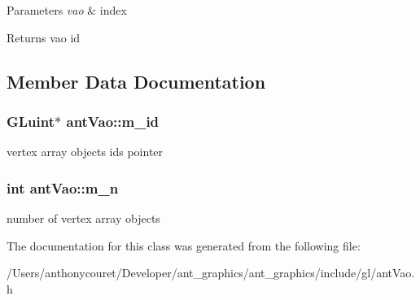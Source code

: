 \begin{DoxyParams}{Parameters}
{\em vao} & index \\
\hline
\end{DoxyParams}
\begin{DoxyReturn}{Returns}
vao id 
\end{DoxyReturn}


\subsection{Member Data Documentation}
\hypertarget{classant_vao_a9ddb4ce72bd223c7da3b826eb7ab4e01}{
\subsubsection[{m\+\_\+id}]{\setlength{\rightskip}{0pt plus 5cm}G\+Luint$\ast$ ant\+Vao\+::m\+\_\+id\hspace{0.3cm}{\ttfamily [private]}}}\label{classant_vao_a9ddb4ce72bd223c7da3b826eb7ab4e01}
vertex array objects ids pointer \hypertarget{classant_vao_a18263ffbcdd4251a7789d5049023d8f8}{
\subsubsection[{m\+\_\+n}]{\setlength{\rightskip}{0pt plus 5cm}int ant\+Vao\+::m\+\_\+n\hspace{0.3cm}{\ttfamily [private]}}}\label{classant_vao_a18263ffbcdd4251a7789d5049023d8f8}
number of vertex array objects 

The documentation for this class was generated from the following file\+:\begin{DoxyCompactItemize}
\item 
/\+Users/anthonycouret/\+Developer/ant\+\_\+graphics/ant\+\_\+graphics/include/gl/ant\+Vao.\+h\end{DoxyCompactItemize}
